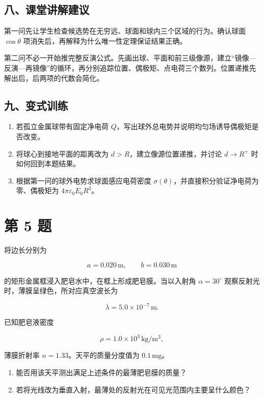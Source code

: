 \documentclass[12pt,a4paper,UTF8]{ctexart}
\newcommand{\tightlist}{\setlength{\itemsep}{0pt}\setlength{\parskip}{0pt}}
\begin{document}
\subsection{八、课堂讲解建议}\label{ux516bux8bfeux5802ux8bb2ux89e3ux5efaux8bae-3}

第一问先让学生检查候选势在无穷远、球面和球内三个区域的行为。确认球面
\(\cos\theta\) 项消失后，再解释为什么唯一性定理保证结果正确。

第二问不必一开始推完整反演公式。先画出球、平面和前三级像源，建立``镜像---反演---再镜像''的循环，再分别追踪位置、偶极矩、点电荷三个数列。位置递推先解出后，后两项的代数会简化。

\subsection{九、变式训练}\label{ux4e5dux53d8ux5f0fux8badux7ec3-3}

\begin{enumerate}
\def\labelenumi{\arabic{enumi}.}
\tightlist
\item
  若孤立金属球带有固定净电荷
  \(Q\)，写出球外总电势并说明均匀场诱导偶极矩是否改变。
\item
  将球心到接地平面的距离改为 \(d>R\)，建立像源位置递推，并讨论
  \(d\to R^+\) 时如何回到本题结果。
\item
  根据第一问的球外电势求球面感应电荷密度
  \(\sigma(\theta)\)，并直接积分验证净电荷为零、偶极矩为
  \(4\pi\varepsilon_0E_0R^3\)。
\end{enumerate}

\newpage

\section{第 5 题}\label{ux7b2c-5-ux9898}

将边长分别为

\[a=0.020\,\mathrm m,\qquad b=0.030\,\mathrm m\]

的矩形金属框浸入肥皂水中，在框上形成肥皂膜。当以入射角
\(\alpha=30^\circ\) 观察反射光时，薄膜呈绿色，所对应真空波长为

\[\lambda=5.0\times10^{-7}\,\mathrm m.\]

已知肥皂液密度

\[\rho=1.0\times10^3\,\mathrm{kg/m^3},\]

薄膜折射率 \(n=1.33\)。天平的质量分度值为 \(0.1\,\mathrm{mg}\)。

\begin{enumerate}
\def\labelenumi{\arabic{enumi}.}
\tightlist
\item
  能否用该天平测出满足上述条件的最薄肥皂膜的质量？
\item
  若将光线改为垂直入射，最薄处的反射光在可见光范围内主要呈什么颜色？
\end{enumerate}
\end{document}
